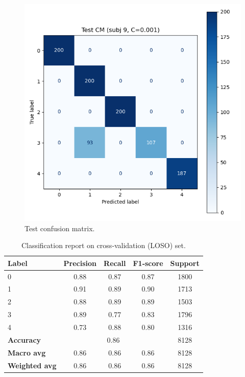 \documentclass{article}
\begin{document}
\begin{figure}
  \centering
  \includegraphics[width=\linewidth]{CM-linear-ovo-80x80-True-False-Test_new_new.png}
  \caption*{Test confusion matrix.}
\end{figure}

\begin{table}
  \centering
  \scriptsize
  \begin{tabular}{l c c c c}
  \hline
  \textbf{Label} & \textbf{Precision} & \textbf{Recall} & \textbf{F1‑score} & \textbf{Support} \\
  \hline
  0           & 0.88 & 0.87 & 0.87 & 1800 \\
  1           & 0.91 & 0.89 & 0.90 & 1713 \\
  2           & 0.88 & 0.89 & 0.89 & 1503 \\
  3           & 0.89 & 0.77 & 0.83 & 1796 \\
  4           & 0.73 & 0.88 & 0.80 & 1316 \\
  \hline
  \textbf{Accuracy}    & \multicolumn{3}{c}{0.86} & 8128 \\
  \textbf{Macro avg}   & 0.86 & 0.86 & 0.86 & 8128 \\
  \textbf{Weighted avg}& 0.86 & 0.86 & 0.86 & 8128 \\
  \hline
  \end{tabular}
  \caption{Classification report on cross‑validation (LOSO) set.}
\end{table}
  
\end{document}
